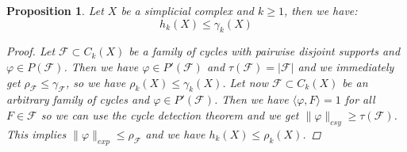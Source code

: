 \documentclass{article}
\newtheorem{prop}{Proposition}[section]
\begin{document}
\begin{prop}\label{proposition1}
Let \(X\) be a simplicial complex and \(k\geq 1\), then we have:
\[
h_k(X)\leq\gamma_k(X)
\]
\begin{proof}
Let \(\mathcal{F}\subset C_k(X)\) be a family of cycles with pairwise disjoint supports and \(\varphi\in P(\mathcal{F})\). Then we have \(\varphi\in P'(\mathcal{F})\) and \(\tau(\mathcal{F})=|\mathcal{F}|\) and we immediately get \(\rho_{\mathcal{F}}\leq\gamma_{\mathcal{F}}\), so we have \(\rho_k(X)\leq\gamma_k(X)\). Let now \(\mathcal{F}\subset C_k(X)\) be an arbitrary family of cycles and \(\varphi\in P'(\mathcal{F})\). Then we have \(\langle\varphi,F\rangle=1\) for all \(F\in\mathcal{F}\) so we can use the cycle detection theorem and we get \(\|\varphi\|_{csy}\geq\tau(\mathcal{F})\). This implies \(\|\varphi\|_{exp}\leq\rho_{\mathcal{F}}\) and we have \(h_k(X)\leq\rho_k(X)\).
\end{proof}
\end{prop}
\end{document}
